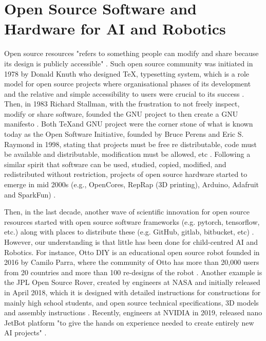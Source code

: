 \documentclass[sigconf]{acmart}
\begin{document}
\section{Open Source Software and Hardware for AI and Robotics}
Open source resources "refers to something people can modify and share because its design is publicly accessible" \cite{opensource2021}.
Such open source community was initiated in 1978 by Donald Knuth who designed \TeX, typesetting system, which is a role model for open source projects where organisational phases of its development and the relative and simple accessibility to users were crucial to its success \cite{gaudeul2007}.
Then, in 1983 Richard Stallman, with the frustration to not freely inspect, modify or share software, founded the GNU project to then create a GNU manifesto \cite{stallman1985}.
Both \TeX and GNU project were the corner stone of what is known today as the Open Software Initiative, founded by Bruce Perens and Eric S. Raymond in 1998, stating that projects must be free re distributable, code must be available and distributable, modification must be allowed, etc \cite{brasseur2018}.
Following a similar spirit that software can be used, studied, copied, modified, and redistributed without restriction, projects of open source hardware started to emerge in mid 2000s (e.g., OpenCores, RepRap (3D printing), Arduino, Adafruit and SparkFun) \cite{pearce2013}.

Then, in the last decade, another wave of scientific innovation for open source resources started with open source software frameworks (e.g. pytorch, tensorflow, etc.) along with places to distribute these (e.g. GitHub, gitlab, bitbucket, etc) \cite{matelabs2017}.
However, our understanding is that little has been done for child-centred AI and Robotics. 
For instance, Otto DIY is an educational open source robot founded in 2016 by Camilo Parra, where the community of Otto has more than 20,000 users from 20 countries and more than 100 re-designs of the robot \cite{OttoDIY:2016}.
Another example is the JPL Open Source Rover, created by engineers at NASA and initially released in April 2018, which it is designed with detailed instructions for constructions for mainly high school students, and open source technical specifications, 3D models and assembly instructions \cite{OSR:2018}.
Recently, engineers at NVIDIA in 2019, released nano JetBot platform  "to give the hands on experience needed to create entirely new AI projects" \cite{nanoJetBot:2019}. 
\end{document}
